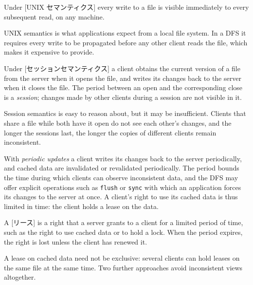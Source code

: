 \documentclass[../main.tex]{subfiles}
\begin{document}
\begin{definition}
  Under [UNIX セマンティクス] every write to a file is
  visible immediately to every subsequent read, on any machine.
\end{definition}

UNIX semantics is what applications expect from a local file system.  In
a DFS it requires every write to be propagated before any other client
reads the file, which makes it expensive to provide.

\begin{definition}
  Under [セッションセマンティクス] a client obtains
  the current version of a file from the server when it opens the file,
  and writes its changes back to the server when it closes the file.  The
  period between an open and the corresponding close is a \emph{session};
  changes made by other clients during a session are not visible in it.
\end{definition}

Session semantics is easy to reason about, but it may be insufficient.
Clients that share a file while both have it open do not see each other's
changes, and the longer the sessions last, the longer the copies of
different clients remain inconsistent.

With \emph{periodic updates} a client writes its changes back to the
server periodically, and cached data are invalidated or revalidated
periodically.  The period
bounds the time during which clients can observe inconsistent data, and the DFS may offer explicit operations such as
\texttt{flush} or \texttt{sync} with which an application forces its changes
to the server at once.  A client's right to use its cached data is thus
limited in time: the client holds a lease on the data.

\begin{definition}[Lease]
  A [リース] is a right that a server grants to a client for a
  limited period of time, such as the right to use cached data or to hold
  a lock.  When the period expires, the right is lost unless the client has
  renewed it.
\end{definition}

A lease on cached data need not be exclusive: several clients can hold
leases on the same file at the same time.  Two further approaches avoid
inconsistent views altogether.
\end{document}
